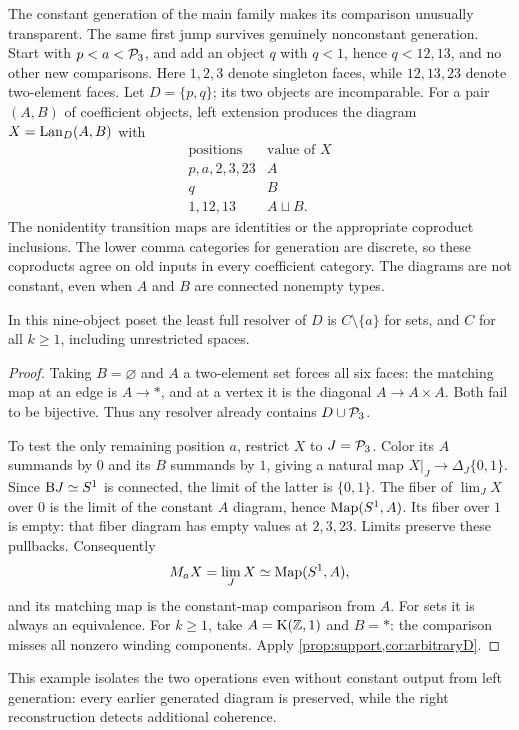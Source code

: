 The constant generation of the main family makes its comparison unusually
transparent. The same first jump survives genuinely nonconstant generation.
Start with $p<a<\mathcal P_3$, and add an object $q$ with $q<1$, hence
$q<12,13$, and no other new comparisons. Here $1,2,3$ denote singleton
faces, while $12,13,23$ denote two-element faces. Let $D=\{p,q\}$;
its two objects are incomparable. For a pair $(A,B)$ of coefficient
objects, left extension produces the diagram $X=\operatorname{Lan}_D(A,B)$ with
\begin{equation}\label{eq:nonconstant}
\begin{array}{c|c}
\text{positions}&\text{value of }X\\\hline
p,a,2,3,23&A\\
q&B\\
1,12,13&A\sqcup B.
\end{array}
\end{equation}
The nonidentity transition maps are identities or the appropriate
coproduct inclusions. The lower comma categories for generation are
discrete, so these coproducts agree on old inputs in every coefficient
category. The diagrams are not constant, even when $A$ and $B$ are
connected nonempty types.

\begin{proposition}\label{prop:nonconstant}
In this nine-object poset the least full resolver of $D$ is $C\setminus
\{a\}$ for sets, and $C$ for all $k\geq1$, including unrestricted
spaces.
\end{proposition}

\begin{proof}
Taking $B=\varnothing$ and $A$ a two-element set forces all six faces:
the matching map at an edge is $A\to *$, and at a vertex it is the
diagonal $A\to A\times A$. Both fail to be bijective. Thus any
resolver already contains $D\cup\mathcal P_3$.

To test the only remaining position $a$, restrict $X$ to
$J=\mathcal P_3$. Color its $A$ summands by $0$ and its $B$ summands by
$1$, giving a natural map $X|_J\to\Delta_J\{0,1\}$. Since
$\mathrm B J\simeq S^1$ is connected, the limit of the latter is
$\{0,1\}$. The fiber of $\lim_JX$ over $0$ is the limit of the
constant $A$ diagram, hence $\operatorname{Map}(S^1,A)$. Its fiber over $1$ is
empty: that fiber diagram has empty values at $2,3,23$. Limits
preserve these pullbacks. Consequently
\[
M_aX=\operatorname*{lim}_JX\simeq\operatorname{Map}(S^1,A),
\]
and its matching map is the constant-map comparison from $A$.
For sets it is always an equivalence. For $k\geq1$, take
$A=\mathrm K(\mathbb Z,1)$ and $B=*$: the comparison misses all nonzero winding
components. Apply \cref{prop:support,cor:arbitraryD}.
\end{proof}

This example isolates the two operations even without constant output
from left generation: every earlier generated diagram is preserved,
while the right reconstruction detects additional coherence.
